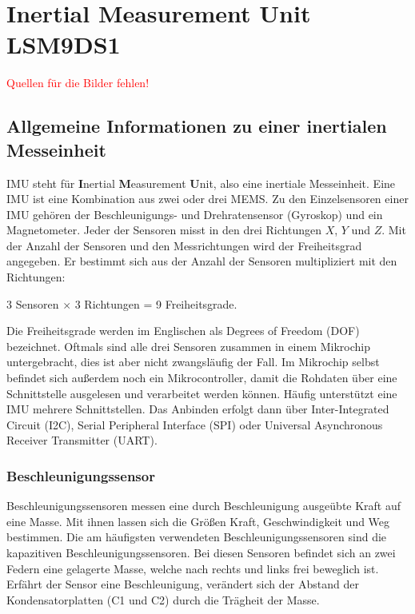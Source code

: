 %
%
%


\chapter{Inertial Measurement Unit LSM9DS1}

\textcolor{red}{Quellen für die Bilder fehlen!}


\section{Allgemeine Informationen zu einer inertialen Messeinheit}

IMU steht für \textbf{I}nertial \textbf{M}easurement \textbf{U}nit, also eine inertiale Messeinheit. Eine IMU ist eine Kombination aus zwei oder drei MEMS. Zu den Einzelsensoren einer IMU gehören der Beschleunigungs- und Drehratensensor (Gyroskop) und ein Magnetometer. Jeder der Sensoren misst in den drei Richtungen $X$, $Y$ und $Z$. Mit der Anzahl der Sensoren und den Messrichtungen wird der Freiheitsgrad angegeben. Er bestimmt sich aus der Anzahl der Sensoren multipliziert mit den Richtungen: 

\begin{center}
  3 Sensoren $\times$ 3 Richtungen = 9 Freiheitsgrade. 
\end{center}


Die Freiheitsgrade werden im Englischen als \glqq Degrees of Freedom\grqq{} (DOF) bezeichnet. Oftmals sind alle drei Sensoren zusammen in einem Mikrochip untergebracht, dies ist aber nicht zwangsläufig der Fall. Im Mikrochip selbst befindet sich außerdem noch ein Mikrocontroller, damit die Rohdaten über eine Schnittstelle ausgelesen und verarbeitet werden können. Häufig unterstützt eine IMU mehrere Schnittstellen. Das Anbinden erfolgt dann über Inter-Integrated Circuit (I2C), Serial Peripheral Interface (SPI) oder Universal Asynchronous Receiver Transmitter (UART). \cite{Weber:2021}



\subsection{Beschleunigungssensor}

Beschleunigungssensoren messen eine durch Beschleunigung ausgeübte Kraft auf eine Masse. Mit ihnen lassen sich die Größen Kraft, Geschwindigkeit und Weg bestimmen. Die am häufigsten verwendeten Beschleunigungssensoren sind die kapazitiven Beschleunigungssensoren. \cite{Traenkler:2014} Bei diesen Sensoren befindet sich an zwei Federn eine gelagerte Masse, welche nach rechts und links frei beweglich ist. Erfährt der Sensor eine Beschleunigung, verändert sich der Abstand der Kondensatorplatten (C1 und C2) durch die Trägheit der Masse. 


